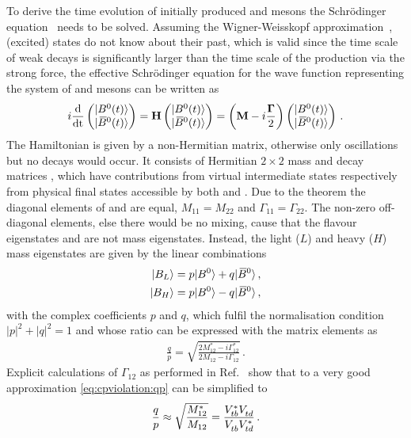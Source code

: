 To derive the time evolution of initially produced \Bd and \Bdb mesons the
Schrödinger equation~\cite{Schroedinger} needs to be solved. Assuming the
Wigner-Weisskopf approximation~\cite{Weisskopf:1930au,*Weisskopf:1930ps}, \ie
(excited) states do not know about their past, which is valid since the time
scale of weak decays is significantly larger than the time scale of the
production via the strong force, the effective Schrödinger equation for the
wave function representing the system of \Bd and \Bdb mesons can be written as
\begin{align}
	i \frac{\mathrm{d}}{\mathrm{dt}}
\begin{pmatrix}
	|{{B}^0}(t)\rangle	\\	|{{\kern 0.18em\overline{\kern -0.18em B}{}}{}^0}(t)\rangle	
\end{pmatrix}
	= \mathbf{H}
\begin{pmatrix}
	|{{B}^0}(t)\rangle	\\	|{{\kern 0.18em\overline{\kern -0.18em B}{}}{}^0}(t)\rangle	
\end{pmatrix}
	= \left(\mathbf{M} - i \frac{\mathbf{\Gamma}}{2}\right)
\begin{pmatrix}
	|{{B}^0}(t)\rangle	\\	|{{\kern 0.18em\overline{\kern -0.18em B}{}}{}^0}(t)\rangle
\end{pmatrix}
\,.
\end{align}
The Hamiltonian  is given by a non-Hermitian matrix, otherwise only
oscillations but no decays would occur. It consists of Hermitian $2\times2$
mass  and decay matrices \matr{\Gamma}, which have contributions from
virtual intermediate states respectively from physical final states accessible
by both \Bd and \Bdb. Due to the \CPT theorem the diagonal elements of
 and \matr{\Gamma} are equal, \ie $M_{11} = M_{22}$ and $\Gamma_{11} =
\Gamma_{22}$. The non-zero off-diagonal elements, else there would be no
mixing, cause that the flavour eigenstates \Bd and \Bdb are not mass
eigenstates. Instead, the light ($L$) and heavy ($H$) mass eigenstates are
given by the linear combinations
\begin{align}
\begin{split}
	|B_L\rangle = p |{{B}^0}\rangle + q |{{\kern 0.18em\overline{\kern -0.18em B}{}}{}^0}\rangle \,,\\
	|B_H\rangle = p |{{B}^0}\rangle - q |{{\kern 0.18em\overline{\kern -0.18em B}{}}{}^0}\rangle \,,
\end{split}
\label{eq:cpviolation:neutralBmesons:superposition}
\end{align}
with the complex coefficients $p$ and $q$, which fulfil the normalisation
condition $|p|^2 + |q|^2 = 1$ and whose ratio can be expressed with the matrix
elements as
\begin{align}
	\frac qp = \sqrt{\frac{2M_{12}^\ast - i\Gamma_{12}^\ast}{2M_{12} - i\Gamma_{12}}}\,.
\label{eq:cpviolation:qp}
\end{align}
Explicit calculations of $\Gamma_{12}$ as performed in
Ref.~\cite{Buras:1984pq} show that to a very good approximation
\cref{eq:cpviolation:qp} can be simplified to
\begin{align}
	\frac qp \approx \sqrt{\frac{M_{12}^\ast}{M_{12}}} = \frac{{V_{{t}{b}}^\ast}{V_{{t}{d}}^{}}}{{V_{{t}{b}}^{}}{V_{{t}{d}}^\ast}}\,.
\label{eq:cpviolation:qp_simplified}
\end{align}

